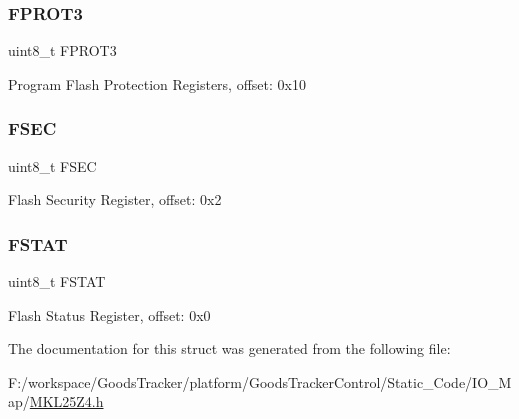 \subsubsection{\texorpdfstring{F\+P\+R\+O\+T3}{FPROT3}}
{\footnotesize\ttfamily uint8\+\_\+t F\+P\+R\+O\+T3}

Program Flash Protection Registers, offset\+: 0x10 \mbox{\label{struct_f_t_f_a___mem_map_a4c7b35caf2d96b1c13a8cb7e15445dcb}} 
\subsubsection{\texorpdfstring{F\+S\+EC}{FSEC}}
{\footnotesize\ttfamily uint8\+\_\+t F\+S\+EC}

Flash Security Register, offset\+: 0x2 \mbox{\label{struct_f_t_f_a___mem_map_abad2f88a7959dce438cb27f7220e6280}} 
\subsubsection{\texorpdfstring{F\+S\+T\+AT}{FSTAT}}
{\footnotesize\ttfamily uint8\+\_\+t F\+S\+T\+AT}

Flash Status Register, offset\+: 0x0 

The documentation for this struct was generated from the following file\+:\begin{DoxyCompactItemize}
\item 
F\+:/workspace/\+Goods\+Tracker/platform/\+Goods\+Tracker\+Control/\+Static\+\_\+\+Code/\+I\+O\+\_\+\+Map/\hyperlink{_m_k_l25_z4_8h}{M\+K\+L25\+Z4.\+h}\end{DoxyCompactItemize}
